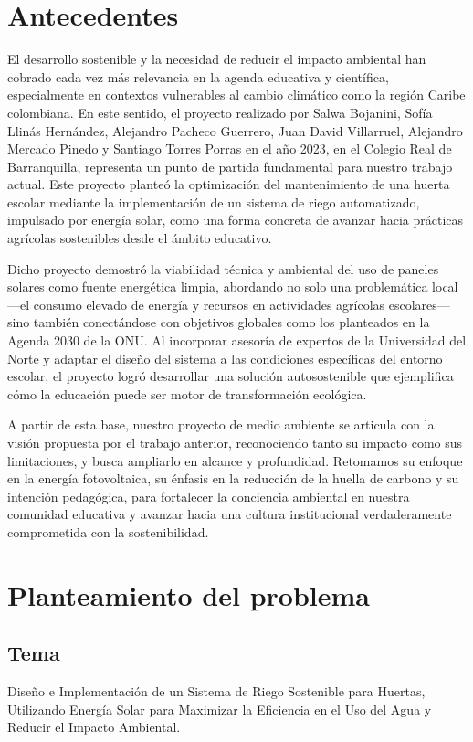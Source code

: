 \documentclass[12pt]{article}
\begin{document}
\section{Antecedentes}
El desarrollo sostenible y la necesidad de reducir el impacto ambiental han cobrado cada vez más relevancia en la agenda educativa y científica, especialmente en contextos vulnerables al cambio climático como la región Caribe colombiana. En este sentido, el proyecto realizado por Salwa Bojanini, Sofía Llinás Hernández, Alejandro Pacheco Guerrero, Juan David Villarruel, Alejandro Mercado Pinedo y Santiago Torres Porras en el año 2023, en el Colegio Real de Barranquilla, representa un punto de partida fundamental para nuestro trabajo actual. Este proyecto planteó la optimización del mantenimiento de una huerta escolar mediante la implementación de un sistema de riego automatizado, impulsado por energía solar, como una forma concreta de avanzar hacia prácticas agrícolas sostenibles desde el ámbito educativo.

Dicho proyecto demostró la viabilidad técnica y ambiental del uso de paneles solares como fuente energética limpia, abordando no solo una problemática local —el consumo elevado de energía y recursos en actividades agrícolas escolares— sino también conectándose con objetivos globales como los planteados en la Agenda 2030 de la ONU. Al incorporar asesoría de expertos de la Universidad del Norte y adaptar el diseño del sistema a las condiciones específicas del entorno escolar, el proyecto logró desarrollar una solución autosostenible que ejemplifica cómo la educación puede ser motor de transformación ecológica.

A partir de esta base, nuestro proyecto de medio ambiente se articula con la visión propuesta por el trabajo anterior, reconociendo tanto su impacto como sus limitaciones, y busca ampliarlo en alcance y profundidad. Retomamos su enfoque en la energía fotovoltaica, su énfasis en la reducción de la huella de carbono y su intención pedagógica, para fortalecer la conciencia ambiental en nuestra comunidad educativa y avanzar hacia una cultura institucional verdaderamente comprometida con la sostenibilidad.
\newpage

\section{Planteamiento del problema}
\subsection{Tema}
Diseño e Implementación de un Sistema de Riego Sostenible para Huertas, Utilizando Energía Solar para Maximizar la Eficiencia en el Uso del Agua y Reducir el Impacto Ambiental.
\end{document}
